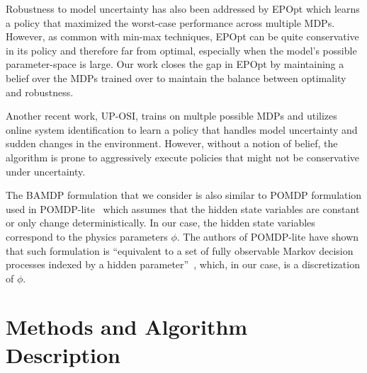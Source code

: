 \documentclass{article}
\begin{document}
Robustness to model uncertainty has also been addressed by EPOpt \cite{rajeswaran2016epopt} which learns a policy that maximized the worst-case performance across multiple MDPs. However, as common with min-max techniques, EPOpt can be quite conservative in its policy and therefore far from optimal, especially when the model's possible parameter-space is large. Our work closes the gap in EPOpt by maintaining a belief over the MDPs trained over to maintain the balance between optimality and robustness.

Another recent work, UP-OSI, trains on multple possible MDPs and utilizes online system identification to learn a policy that handles model uncertainty and sudden changes in the environment. However, without a notion of belief, the algorithm is prone to aggressively execute policies that might not be conservative under uncertainty.

%
The BAMDP formulation that we consider is also similar to POMDP formulation used in POMDP-lite~\cite{chen2016pomdp} which assumes that the hidden state variables are constant or only change deterministically. In our case, the hidden state variables correspond to the physics parameters $\phi$. The authors of POMDP-lite have shown that such formulation is ``equivalent to a set of fully observable Markov decision processes indexed by a hidden parameter''~\cite{chen2016pomdp}, which, in our case, is a discretization of $\phi$.


\section{Methods and Algorithm Description}
\end{document}
